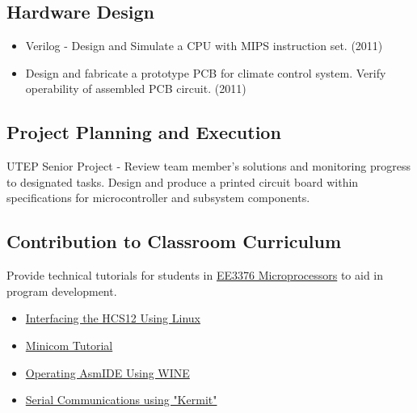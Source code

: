 \begin{describe}


\end{describe}%
\newpage
\begin{describe}
\subsection*{Hardware Design}
\begin{itemize}
    \item Verilog - Design and Simulate a CPU with MIPS instruction set. (2011)
    \item  Design and fabricate a prototype PCB for climate control system. Verify operability of assembled PCB circuit. (2011)
\end{itemize}
\subsection*{Project Planning and Execution}
UTEP Senior Project - Review team member's solutions and monitoring progress to designated tasks. Design and produce a printed circuit board within specifications for microcontroller and subsystem components.
\subsection*{Contribution to Classroom Curriculum}
Provide technical tutorials for students in \href{http://www.ece.utep.edu/courses/web3376/EE3376.html}{EE3376 Microprocessors} to aid in program development.%
\begin{itemize}[leftmargin=*]
    \item \href{http://www.ece.utep.edu/courses/web3376/Linux.html}{Interfacing the HCS12 Using Linux}
    \item \href{http://www.ece.utep.edu/courses/web3376/MINICOM.html}{Minicom Tutorial}
    \item \href{http://www.ece.utep.edu/courses/web3376/WINE.html}{Operating AsmIDE Using WINE} %
    \item \href{http://www.ece.utep.edu/courses/web3376/Kermit.html}{Serial Communications using "Kermit"}
\end{itemize}
\end{describe}

